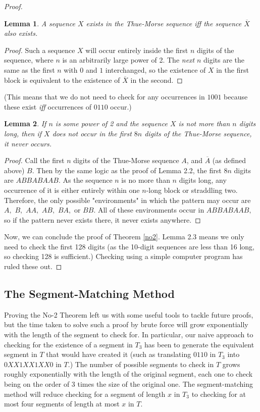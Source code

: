 \documentclass{article}
\newtheorem{lemma}{Lemma}[section]
\begin{document}
\begin{proof}
\begin{lemma}
\label{xiffxbar}
A sequence $X$ exists in the Thue-Morse sequence \emph{iff} the sequence $\overline{X}$ also exists.
\end{lemma}

\begin{proof}
Such a sequence $X$ will occur entirely inside the first $n$ digits of the sequence, where $n$ is an arbitrarily large power of 2. The \emph{next} $n$ digits are the same as the first $n$ with $0$ and $1$ interchanged, so the existence of $X$ in the first block is equivalent to the existence of $\overline{X}$ in the second.
\end{proof}

(This means that we do not need to check for any occurrences in $1001$ because these exist \emph{iff} occurrences of $0110$ occur.)

\begin{lemma}
\label{recurrence}
If $n$ is some power of 2 and the sequence $X$ is not more than $n$ digits long, then if $X$ does not occur in the first $8n$ digits of the Thue-Morse sequence, it never occurs.
\end{lemma}

\begin{proof}
Call the first $n$ digits of the Thue-Morse sequence $A$, and $\overline{A}$ (as defined above) $B.$ Then by the same logic as the proof of Lemma 2.2, the first $8n$ digits are $ABBABAAB.$ As the sequence $n$ is no more than $n$ digits long, any occurrence of it is either entirely within one $n$-long block or straddling two. Therefore, the only possible "environments" in which the pattern may occur are $A,$ $B,$ $AA,$ $AB,$ $BA,$ or $BB.$ All of these environments occur in $ABBABAAB,$ so if the pattern never exists there, it never exists anywhere.
\end{proof}

Now, we can conclude the proof of Theorem \ref{no2}. Lemma 2.3 means we only need to check the first 128 digits (as the 10-digit sequences are less than 16 long, so checking 128 is sufficient.) Checking using a simple computer program has ruled these out.
\end{proof}

\subsection{The Segment-Matching Method}

Proving the No-2 Theorem left us with some useful tools to tackle future proofs, but the time taken to solve such a proof by brute force will grow exponentially with the length of the segment to check for. In particular, our naive approach to checking for the existence of a segment in $T_3$ has been to generate the equivalent segment in $T$ that would have created it (such as translating $0110$ in $T_3$ into $0XX1XX1XX0$ in $T$.) The number of possible segments to check in $T$ grows roughly exponentially with the length of the original segment, each one to check being on the order of 3 times the size of the original one. The segment-matching method will reduce checking for a segment of length $x$ in $T_3$ to checking for at most four segments of length at most $x$ in $T.$
\end{document}
